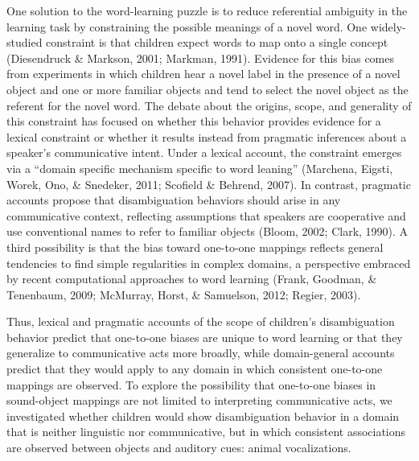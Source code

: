 \documentclass[english,floatsintext,man]{apa6}
\theoremstyle{definition}
\theoremstyle{definition}
\theoremstyle{definition}
\theoremstyle{remark}
\begin{document}
One solution to the word-learning puzzle is to reduce referential
ambiguity in the learning task by constraining the possible meanings of
a novel word. One widely-studied constraint is that children expect
words to map onto a single concept (Diesendruck \& Markson, 2001;
Markman, 1991). Evidence for this bias comes from experiments in which
children hear a novel label in the presence of a novel object and one or
more familiar objects and tend to select the novel object as the
referent for the novel word. The debate about the origins, scope, and
generality of this constraint has focused on whether this behavior
provides evidence for a lexical constraint or whether it results instead
from pragmatic inferences about a speaker's communicative intent. Under
a lexical account, the constraint emerges via a \enquote{domain specific
mechanism specific to word leaning} (Marchena, Eigsti, Worek, Ono, \&
Snedeker, 2011; Scofield \& Behrend, 2007). In contrast, pragmatic
accounts propose that disambiguation behaviors should arise in any
communicative context, reflecting assumptions that speakers are
cooperative and use conventional names to refer to familiar objects
(Bloom, 2002; Clark, 1990). A third possibility is that the bias toward
one-to-one mappings reflects general tendencies to find simple
regularities in complex domains, a perspective embraced by recent
computational approaches to word learning (Frank, Goodman, \& Tenenbaum,
2009; McMurray, Horst, \& Samuelson, 2012; Regier, 2003).

Thus, lexical and pragmatic accounts of the scope of children's
disambiguation behavior predict that one-to-one biases are unique to
word learning or that they generalize to communicative acts more
broadly, while domain-general accounts predict that they would apply to
any domain in which consistent one-to-one mappings are observed. To
explore the possibility that one-to-one biases in sound-object mappings
are not limited to interpreting communicative acts, we investigated
whether children would show disambiguation behavior in a domain that is
neither linguistic nor communicative, but in which consistent
associations are observed between objects and auditory cues: animal
vocalizations.
\end{document}
